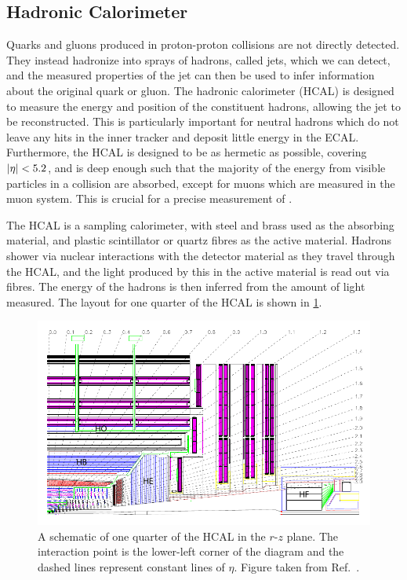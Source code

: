 \subsection{Hadronic Calorimeter}
Quarks and gluons produced in proton-proton collisions are not directly detected. They instead hadronize into sprays of hadrons, called jets, which we can detect, and the measured properties of the jet can then be used to infer information about the original quark or gluon. The hadronic calorimeter (HCAL) is designed to measure the energy and position of the constituent hadrons, allowing the jet to be reconstructed. This is particularly important for neutral hadrons which do not leave any hits in the inner tracker and deposit little energy in the ECAL. Furthermore, the HCAL is designed to be as hermetic as possible, covering $\lvert \eta \rvert < 5.2$, and is deep enough such that the majority of the energy from visible particles in a collision are absorbed, except for muons which are measured in the muon system. This is crucial for a precise measurement of \ptmiss. 

The HCAL is a sampling calorimeter, with steel and brass used as the absorbing material, and plastic scintillator or quartz fibres as the active material. Hadrons shower via nuclear interactions with the detector material as they travel through the HCAL, and the light produced by this in the active material is read out via fibres. The energy of the hadrons is then inferred from the amount of light measured. The layout for one quarter of the HCAL is shown in \cref{fig:hcal}. 

\begin{figure}
  \centering
  \includegraphics[width=\textwidth]{Figures/Detector/CMS/hcal.pdf}
  \caption[The CMS HCAL]{A schematic of one quarter of the HCAL in the $r$-$z$ plane. The interaction point is the lower-left corner of the diagram and the dashed lines represent constant lines of $\eta$. Figure taken from Ref.~\cite{CMS:2008xjf}.}\label{fig:hcal}
\end{figure}


